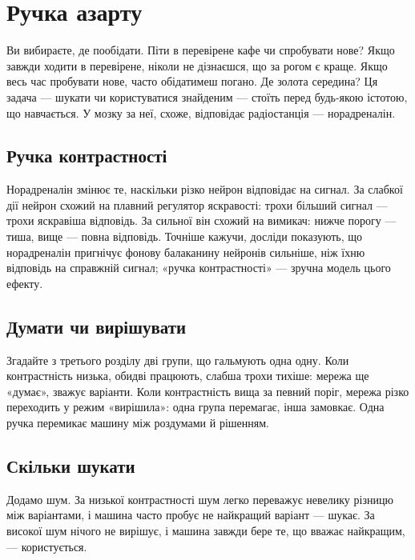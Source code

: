 \chapter{Ручка азарту}

Ви вибираєте, де пообідати. Піти в перевірене кафе чи спробувати нове? Якщо завжди ходити в перевірене, ніколи не дізнаєшся, що за рогом є краще. Якщо весь час пробувати нове, часто обідатимеш погано. Де золота середина? Ця задача --- шукати чи користуватися знайденим --- стоїть перед будь-якою істотою, що навчається. У мозку за неї, схоже, відповідає радіостанція  --- норадреналін.

\section*{Ручка контрастності}

Норадреналін змінює те, наскільки різко нейрон відповідає на сигнал. За слабкої дії нейрон схожий на плавний регулятор яскравості: трохи більший сигнал --- трохи яскравіша відповідь. За сильної він схожий на вимикач: нижче порогу --- тиша, вище --- повна відповідь. Точніше кажучи, досліди показують, що норадреналін пригнічує фонову балаканину нейронів сильніше, ніж їхню відповідь на справжній сигнал; «ручка контрастності» --- зручна модель цього ефекту.


\section*{Думати чи вирішувати}

Згадайте з третього розділу дві групи, що гальмують одна одну. Коли контрастність низька, обидві працюють, слабша трохи тихіше: мережа ще «думає», зважує варіанти. Коли контрастність вища за певний поріг, мережа різко переходить у режим «вирішила»: одна група перемагає, інша замовкає. Одна ручка перемикає машину між роздумами й рішенням.

\section*{Скільки шукати}

Додамо шум. За низької контрастності шум легко переважує невелику різницю між варіантами, і машина часто пробує не найкращий варіант --- шукає. За високої шум нічого не вирішує, і машина завжди бере те, що вважає найкращим, --- користується.

